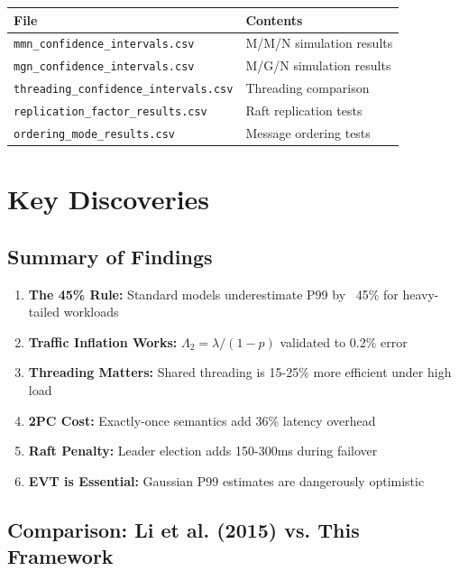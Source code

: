 \documentclass[11pt,a4paper]{article}
\begin{document}
\begin{center}
\begin{tabular}{ll}
\toprule
\textbf{File} & \textbf{Contents} \\
\midrule
\texttt{mmn\_confidence\_intervals.csv} & M/M/N simulation results \\
\texttt{mgn\_confidence\_intervals.csv} & M/G/N simulation results \\
\texttt{threading\_confidence\_intervals.csv} & Threading comparison \\
\texttt{replication\_factor\_results.csv} & Raft replication tests \\
\texttt{ordering\_mode\_results.csv} & Message ordering tests \\
\bottomrule
\end{tabular}
\end{center}


\section{Key Discoveries}

\subsection{Summary of Findings}

\begin{enumerate}
    \item \textbf{The 45\% Rule:} Standard models underestimate P99 by ~45\% for heavy-tailed workloads
    \item \textbf{Traffic Inflation Works:} $\Lambda_2 = \lambda/(1-p)$ validated to 0.2\% error
    \item \textbf{Threading Matters:} Shared threading is 15-25\% more efficient under high load
    \item \textbf{2PC Cost:} Exactly-once semantics add 36\% latency overhead
    \item \textbf{Raft Penalty:} Leader election adds 150-300ms during failover
    \item \textbf{EVT is Essential:} Gaussian P99 estimates are dangerously optimistic
\end{enumerate}

\subsection{Comparison: Li et al. (2015) vs. This Framework}
\end{document}
